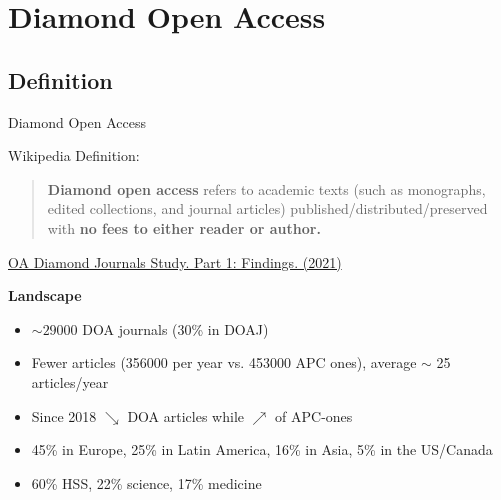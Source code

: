 \documentclass[10pt,compress,serif,aspectratio=169]{beamer}
\begin{document}
\section{Diamond Open Access}
\subsection{Definition}

\begin{frame}[t]{Diamond Open Access}

Wikipedia Definition:\newline \newline
 \begin{quote}
   \textbf{Diamond open access} refers to academic texts (such as monographs, edited collections, and journal articles) published/distributed/preserved with \textbf{no fees to either reader or author.} \newline
 \end{quote}
 \pause
\href{https://doi.org/10.5281/zenodo.4558704}{OA Diamond Journals Study. Part 1: Findings. (2021)\newline}

\textbf{Landscape}\\
\begin{itemize}
\item $\sim 29000$ DOA journals (30\% in DOAJ)
\item Fewer articles (356000 per year vs. 453000 APC ones), average $\sim$ 25 articles/year
\item Since 2018 $\searrow$ DOA articles while $\nearrow$ of APC-ones
\item 45\% in Europe, 25\% in Latin America, 16\% in Asia, 5\% in the US/Canada
\item 60\% HSS, 22\% science, 17\% medicine
\end{itemize}

\end{frame}

\end{document}

